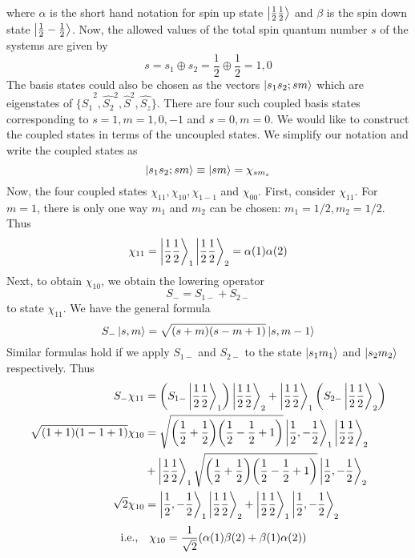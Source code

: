 where $\alpha$ is the short hand notation for spin up state $\ket{\frac{1}{2} \frac{1}{2}}$ and $\beta$ is the spin down state $\ket{\frac{1}{2} -\frac{1}{2}}$. Now, the  allowed values of the total spin quantum number $s$ of the systems are given by 
\begin{equation*}
s = s_1 \oplus s_2 = \frac{1}{2} \oplus \frac{1}{2} = 1, 0
\end{equation*}
The basis states could also be chosen as the vectors $\ket{s_1 s_2; s m}$ which are eigenstates of $\{\hat{S_1}^2, \hat{S_2}^2, \hat{S}^2,\hat{S_z}\}$. There are four such coupled basis states corresponding to $s=1, m=1,0,-1$ and $s=0,m=0$. We would like to construct the coupled states in terms of the uncoupled states. We simplify our notation and write the coupled states as
\begin{equation*}
\ket{s_1 s_2; s m} \equiv \ket{s m} = \chi_{s m_s}
\end{equation*}
Now, the four coupled states $\chi_{11}, \chi_{10}, \chi_{1-1}$ and $\chi_{00}$. First, consider $\chi_{11}$. For $m=1$, there is only one way $m_1$ and $m_2$ can be chosen: $m_1=1/2, m_2=1/2$. Thus
\begin{equation}
\label{chapter19-eqn1-spin-half}
\chi_{11} = \ket{\frac{1}{2}\frac{1}{2}}_1 \ket{\frac{1}{2} \frac{1}{2}}_2 = \alpha(1) \alpha(2)
\end{equation}
Next, to obtain $\chi_{1 0}$, we obtain the lowering operator
\begin{equation*}
	S_{-} = S_{1-} + S_{2-}
\end{equation*}
to state $\chi_{11}$. We have the general formula
\begin{equation}
S_{-}\ket{s, m} = \sqrt{(s + m)(s - m + 1)} \ket{s, m-1}
\end{equation}
Similar formulas hold if we apply $S_{1-}$ and $S_{2-}$ to the state $\ket{s_1 m_1}$ and $\ket{s_2 m_2}$ respectively. Thus
\begin{align*}
\begin{split}
S_{-} \chi_{11} &= \qty(S_{1-}\ket{\frac{1}{2}\frac{1}{2}}_1)\ket{\frac{1}{2}\frac{1}{2}}_2 + \ket{\frac{1}{2}\frac{1}{2}}_1\qty(S_{2-}\ket{\frac{1}{2}\frac{1}{2}}_2)\\
\sqrt{(1 + 1)(1 - 1 + 1)} \chi_{1 0} &= \sqrt{\qty(\frac{1}{2}+\frac{1}{2})\qty(\frac{1}{2} - \frac{1}{2} + 1)} \ket{\frac{1}{2},-\frac{1}{2}}_1\ket{\frac{1}{2} \frac{1}{2}}_2 \\
&+ \ket{\frac{1}{2} \frac{1}{2}}_1 \sqrt{\qty(\frac{1}{2}+\frac{1}{2})\qty(\frac{1}{2} - \frac{1}{2} + 1)}\ket{\frac{1}{2},-\frac{1}{2}}_2 \\
\sqrt{2} \chi_{1 0} &= \ket{\frac{1}{2},-\frac{1}{2}}_1 \ket{\frac{1}{2} \frac{1}{2}}_2 + \ket{\frac{1}{2} \frac{1}{2}}_1 \ket{\frac{1}{2},-\frac{1}{2}}_2
\end{split}
\end{align*}
\begin{equation}
\label{chapter19-eqn2-spin-half}
\qq{i.e.,}\chi_{1 0} = \frac{1}{\sqrt{2}} \qty(\alpha(1)\beta(2) + \beta(1)\alpha(2))
\end{equation}


